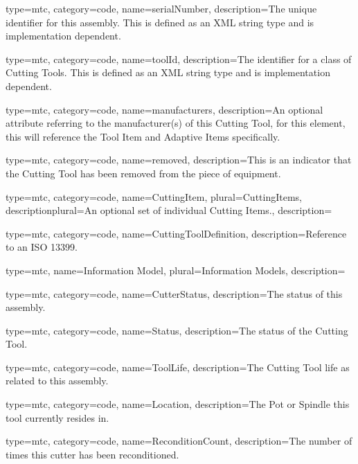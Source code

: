 {
  type=mtc,
  category=code,
  name={serialNumber},
  description={The unique identifier for this assembly. This is defined as an XML string type and is implementation dependent.}
}


{
  type=mtc,
  category=code,
  name={toolId},
  description={The identifier for a class of Cutting Tools. This is defined as an XML string type and is implementation dependent. }
}


{
  type=mtc,
  category=code,
  name={manufacturers},
  description={An optional attribute referring to the manufacturer(s) of this Cutting Tool, for this element, this will reference the Tool Item and Adaptive Items specifically. }
}


{
  type=mtc,
  category=code,
  name={removed},
  description={This is an indicator that the Cutting Tool has been removed from the piece of equipment. }
}


{
  type=mtc,
  category=code,
  name={CuttingItem},
  plural={CuttingItems},
  descriptionplural={An optional set of individual Cutting Items.},
  description={}
}


{
  type=mtc,
  category=code,
  name={CuttingToolDefinition},
  description={Reference to an ISO 13399.}
}


{
  type=mtc,
  name={Information Model},
  plural={Information Models},
  description={}
}


{
  type=mtc,
  category=code,
  name={CutterStatus},
  description={The status of this assembly.}
}


{
  type=mtc,
  category=code,
  name={Status},
  description={The status of the Cutting Tool.}
}


{
  type=mtc,
  category=code,
  name={ToolLife},
  description={The Cutting Tool life as related to this assembly.}
}


{
  type=mtc,
  category=code,
  name={Location},
  description={The Pot or Spindle this tool currently resides in.}
}


{
  type=mtc,
  category=code,
  name={ReconditionCount},
  description={The number of times this cutter has been reconditioned.}
}


